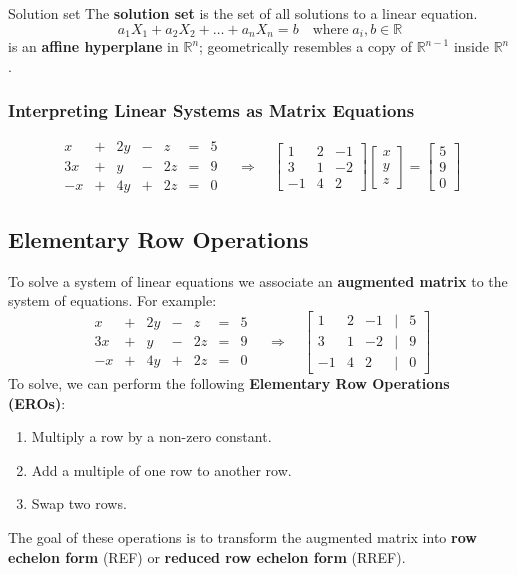 \documentclass[a4paper, 9pt]{extarticle}
\begin{document}
\begin{definitionbox}{Solution set}{}
  The \textbf{solution set} is the set of all solutions to a linear equation.
  $$a_1X_1 + a_2X_2 + \ldots + a_nX_n = b \quad \text{where} \; a_i, b \in \mathbb{R}$$
  is an \textbf{affine hyperplane} in $\mathbb{R}^n$; geometrically resembles a copy of $\mathbb{R}^{n-1}$ inside $\mathbb{R}^n$.
\end{definitionbox}
\subsubsection{Interpreting Linear Systems as Matrix Equations}
$$
  \begin{array}{ccccccc}
    x  & + & 2y & - & z  & = & 5 \\
    3x & + & y  & - & 2z & = & 9 \\
    -x & + & 4y & + & 2z & = & 0
  \end{array}
  \quad \Rightarrow \quad
  \begin{bmatrix}
    1  & 2 & -1 \\
    3  & 1 & -2 \\
    -1 & 4 & 2
  \end{bmatrix}
  \begin{bmatrix}
    x \\
    y \\
    z
  \end{bmatrix}
  =
  \begin{bmatrix}
    5 \\
    9 \\
    0
  \end{bmatrix}
$$
\subsection{Elementary Row Operations}
To solve a system of linear equations we associate an \textbf{augmented matrix} to the system of equations. For example:
$$
  \begin{array}
    {ccccccc}x & + & 2y & - & z  & = & 5 \\
    3x         & + & y  & - & 2z & = & 9 \\
    -x         & + & 4y & + & 2z & = & 0
  \end{array}
  \quad \Rightarrow \quad
  \begin{bmatrix}
    1  & 2 & -1 & | & 5 \\
    3  & 1 & -2 & | & 9 \\
    -1 & 4 & 2  & | & 0
  \end{bmatrix}
$$
To solve, we can perform the following \textbf{Elementary Row Operations (EROs)}:
\begin{enumerate}
  \item Multiply a row by a non-zero constant.
  \item Add a multiple of one row to another row.
  \item Swap two rows.
\end{enumerate}
The goal of these operations is to transform the augmented matrix into \textbf{row echelon form} (REF) or \textbf{reduced row echelon form} (RREF).
\end{document}

